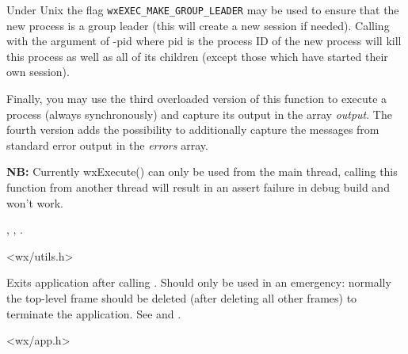 Under Unix the flag {\tt wxEXEC\_MAKE\_GROUP\_LEADER} may be used to ensure
that the new process is a group leader (this will create a new session if
needed). Calling  with the argument of -pid where pid
is the process ID of the new process will kill this process as well as all of
its children (except those which have started their own session).

Finally, you may use the third overloaded version of this function to execute
a process (always synchronously) and capture its output in the array
{\it output}. The fourth version adds the possibility to additionally capture
the messages from standard error output in the {\it errors} array.

{\bf NB:} Currently wxExecute() can only be used from the main thread, calling
this function from another thread will result in an assert failure in debug
build and won't work.


, , .







<wx/utils.h>


\label{wxexit}


Exits application after calling .
Should only be used in an emergency: normally the top-level frame
should be deleted (after deleting all other frames) to terminate the
application. See  and .


<wx/app.h>


\label{wxkill}

